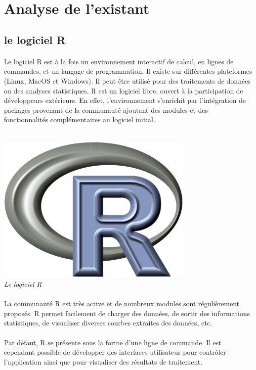 \section{Analyse de l'existant}
\subsection{le logiciel R}
\paragraph{}

Le logiciel R est à la fois un environnement interactif de calcul, en lignes de
commandes, et un langage de programmation. Il existe sur différentes plateformes
(Linux, MacOS et Windows). Il peut être utilisé pour des traitements de données
ou des analyses statistiques. R est un logiciel libre, ouvert à la participation de
développeurs extérieurs. En effet, l’environnement s’enrichit par l’intégration de
packages provenant de la communauté ajoutant des modules et des fonctionnalités
complémentaires au logiciel initial.\\\\

\begin{center}
\includegraphics[scale=0.7]{Rlogo.png}\\
\textit{Le logiciel R}
\end{center}

\paragraph{}
La communauté R est très active et de nombreux modules sont régulièrement proposés.
R permet facilement de charger des données, de sortir des informations statistiques, de visualiser
diverses courbes extraites des données, etc.
\paragraph{}
Par défaut, R se présente sous la forme d'une ligne de commande. Il est cependant possible de
développer des interfaces utilisateur pour contrôler l'application ainsi que pour visualiser des
résultats de traitement.

